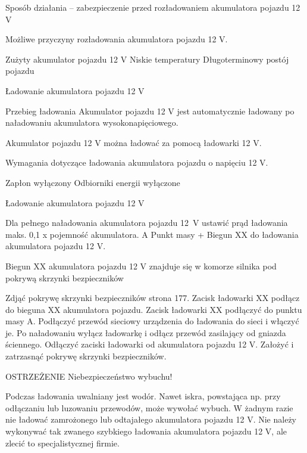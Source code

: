 Sposób działania – zabezpieczenie przed rozładowaniem akumulatora pojazdu 12 V

Możliwe przyczyny rozładowania akumulatora pojazdu 12 V.
\begin{itemizeTriangle}
	\itemTriangle Zużyty akumulator pojazdu 12 V
	\itemTriangle Niskie temperatury
	\itemTriangle Długoterminowy postój pojazdu
\end{itemizeTriangle}

Ładowanie akumulatora pojazdu 12 V

Przebieg ładowania
Akumulator pojazdu 12 V jest automatycznie ładowany po naładowaniu akumulatora wysokonapięciowego.

Akumulator pojazdu 12 V można ładować za pomocą ładowarki 12 V.

Wymagania dotyczące ładowania akumulatora pojazdu o napięciu 12 V.
\begin{itemizeTick}
	\itemTick Zapłon wyłączony
	\itemTick Odbiorniki energii wyłączone
\end{itemizeTick}

Ładowanie akumulatora pojazdu 12 V

Dla pełnego naładowania akumulatora pojazdu 12~V ustawić prąd ładowania maks. 0,1 x pojemność akumulatora.
A Punkt masy
+ Biegun XX do ładowania akumulatora pojazdu 12 V.

Biegun XX akumulatora pojazdu 12 V znajduje się w komorze silnika pod pokrywą skrzynki bezpieczników
\begin{itemizeArrow}
	\itemArrow Zdjąć pokrywę skrzynki bezpieczników \guillemotright strona 177.
	\itemArrow Zacisk ładowarki XX podłącz do bieguna XX akumulatora pojazdu.
	\itemArrow Zacisk ładowarki XX podłączyć do punktu masy A.
	\itemArrow Podłączyć przewód sieciowy urządzenia do ładowania do sieci i włączyć je.
	\itemArrow Po naładowaniu wyłącz ładowarkę i odłącz przewód zasilający od gniazda ściennego.
	\itemArrow Odłączyć zaciski ładowarki od akumulatora pojazdu 12 V.
	\itemArrow Założyć i zatrzasnąć pokrywę skrzynki bezpieczników.
\end{itemizeArrow}

OSTRZEŻENIE
Niebezpieczeństwo wybuchu!
\begin{itemizeTriangle}
	\itemTriangle Podczas ładowania uwalniany jest wodór. Nawet iskra, powstająca np. przy odłączaniu lub luzowaniu przewodów, może wywołać wybuch.
	\itemTriangle W żadnym razie nie ładować zamrożonego lub odtajałego akumulatora pojazdu 12 V.
	\itemTriangle Nie należy wykonywać tak zwanego szybkiego ładowania akumulatora pojazdu 12 V, ale zlecić to specjalistycznej firmie.
\end{itemizeTriangle}

